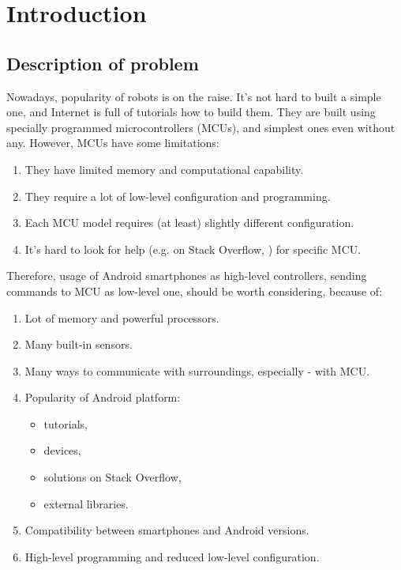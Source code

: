 \chapter{Introduction}

\section{Description of problem}
Nowadays, popularity of robots is on the raise. 
It's not hard to built a simple one, and Internet is full of tutorials how to
build them.
They are built using specially programmed microcontrollers (MCUs), and simplest
ones even without any.
However, MCUs have some limitations:
\begin{enumerate}
  \item They have limited memory and computational capability.
  \item They require a lot of low-level configuration and programming.
  \item Each MCU model requires (at least) slightly different configuration.
  \item It's hard to look for help (e.g. on Stack Overflow,
  \cite{stack_overflow}) for specific MCU.
\end{enumerate}
Therefore, usage of Android smartphones as high-level controllers, sending
commands to MCU as low-level one, should be worth considering, because of:
\begin{enumerate}
  \item Lot of memory and powerful processors.
  \item Many built-in sensors.
  \item Many ways to communicate with surroundings, especially -
  with MCU.
  \item Popularity of Android platform:
  	\begin{itemize}
  	  \item tutorials,
  	  \item devices,
  	  \item solutions on Stack Overflow,
  	  \item external libraries.
  	\end{itemize}
  \item Compatibility between smartphones and Android versions.
  \item High-level programming and reduced low-level configuration.
\end{enumerate}

